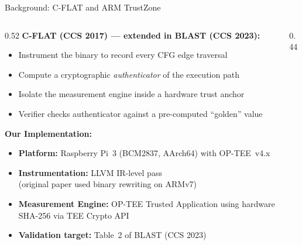 \documentclass[aspectratio=169]{beamer}
\begin{document}
\begin{frame}{Background: C-FLAT and ARM TrustZone}
\begin{columns}[T]

\begin{column}{0.52\textwidth}
  \textbf{C-FLAT (CCS 2017) — extended in BLAST (CCS 2023):}
  \begin{itemize}
    \item Instrument the binary to record every CFG edge traversal
    \item Compute a cryptographic \emph{authenticator} of the execution path
    \item Isolate the measurement engine inside a hardware trust anchor
    \item Verifier checks authenticator against a pre-computed ``golden'' value
  \end{itemize}

  \bigskip
  \textbf{Our Implementation:}
  \begin{itemize}
    \item \textbf{Platform:} Raspberry Pi~3 (BCM2837, AArch64) with OP-TEE~v4.x
    \item \textbf{Instrumentation:} LLVM IR-level pass \\
          (original paper used binary rewriting on ARMv7)
    \item \textbf{Measurement Engine:} OP-TEE Trusted Application using
          hardware SHA-256 via TEE Crypto API
    \item \textbf{Validation target:} Table~2 of BLAST (CCS 2023)
  \end{itemize}
\end{column}

\begin{column}{0.44\textwidth}
  \centering
\end{column}
\end{columns}
\end{frame}
\end{document}
